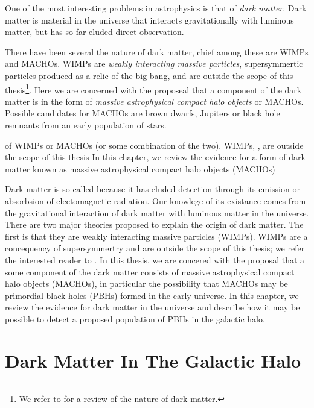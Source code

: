 
One of the most interesting problems in astrophysics is that of \emph{dark
matter}. Dark matter is material in the universe that interacts
gravitationally with luminous matter, but has so far eluded direct
observation. 


There have been several  the nature of dark matter,
chief among these are WIMPs and MACHOs. WIMPs are \emph{weakly interacting
massive particles}, supersymmertic particles produced as a relic of the big
bang, and are outside the scope of this thesis\footnote{We refer to
\cite{Griest:1995gs} for a review of the nature of dark matter.}. Here we are
concerned with the proposeal that a component of the dark matter is in the
form of \emph{massive astrophysical compact halo objects} or
MACHOs\cite{Griest:1990vu}. Possible candidates for MACHOs are brown dwarfs,
Jupiters or black hole remnants from an early population of stars.

of WIMPs or MACHOs (or some combination of the two).  WIMPs, , are outside the scope of this
thesis
In this chapter, we review the evidence for a form of dark matter
known as massive astrophysical compact halo objects (MACHOs)\cite{x}


Dark matter is so called because it has eluded detection through its
emission or absorbsion of electomagnetic radiation. Our knowlege of its
existance comes from the gravitational interaction of dark matter with
luminous matter in the universe. There are two major theories proposed to
explain the origin of dark matter. The first is that they are weakly
interacting massive particles (WIMPs). WIMPs are a concequency of
supersymmertry and are outside the scope of this thesis; we refer the
interested reader to \cite{XXX}.  In this thesis, we are concered with the
proposal that a some component of the dark matter consists of massive
astrophysical compact halo objects (MACHOs), in particular the possibility
that MACHOs may be primordial black holes (PBHs) formed in the early universe.
In this chapter, we review the evidence for dark matter in the universe and
describe how it may be possible to detect a proposed population of PBHs in the
galactic halo.

\section{Dark Matter In The Galactic Halo}
\label{s:darkmatter}

